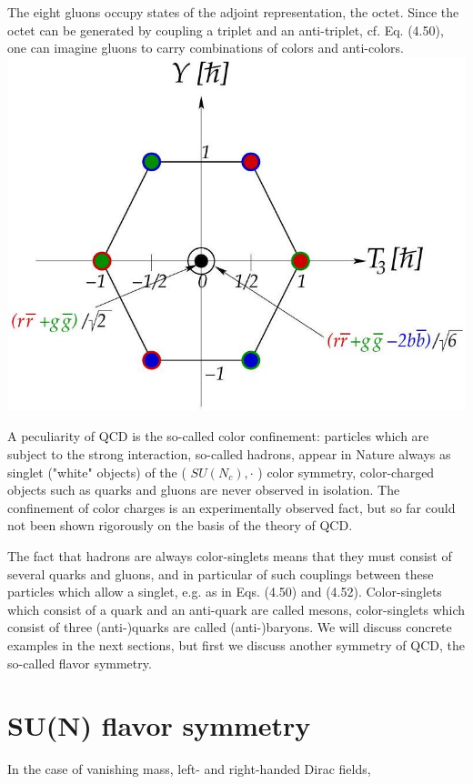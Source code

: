 \documentclass[10pt, letterpaper]{article}
\begin{document}
The eight gluons occupy states of the adjoint representation, the octet. Since the octet can be generated by coupling a triplet and an anti-triplet, cf. Eq. (4.50), one can imagine gluons to carry combinations of colors and anti-colors.\\
\includegraphics[scale=0.3, center]{2025_05_20_8618f55a41bfe980b4b2g-62(1)}

A peculiarity of QCD is the so-called color confinement: particles which are subject to the strong interaction, so-called hadrons, appear in Nature always as singlet ("white" objects) of the ( $S U\left(N_{c}\right), \cdot$ ) color symmetry, color-charged objects such as quarks and gluons are never observed in isolation. The confinement of color charges is an experimentally observed fact, but so far could not been shown rigorously on the basis of the theory of QCD.

The fact that hadrons are always color-singlets means that they must consist of several quarks and gluons, and in particular of such couplings between these particles which allow a singlet, e.g. as in Eqs. (4.50) and (4.52). Color-singlets which consist of a quark and an anti-quark are called mesons, color-singlets which consist of three (anti-)quarks are called (anti-)baryons. We will discuss concrete examples in the next sections, but first we discuss another symmetry of QCD, the so-called flavor symmetry.

\section{SU(N) flavor symmetry}
In the case of vanishing mass, left- and right-handed Dirac fields,
\end{document}
